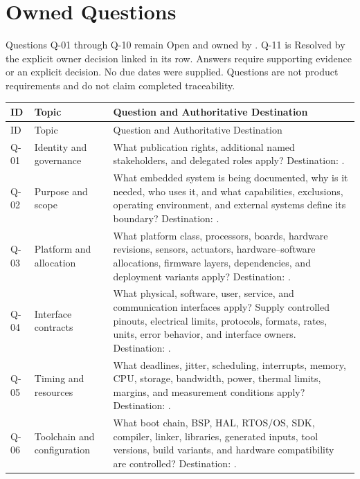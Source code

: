 \section{Owned Questions}
\label{Section:OwnedQuestions}
Questions Q-01 through Q-10 remain Open and owned by \DocumentOwner.
Q-11 is Resolved by the explicit owner decision linked in its row. Answers require
supporting evidence or an explicit decision. No due dates were supplied.
Questions are not product requirements and do not claim completed traceability.
\small
\begin{tabularx}{\linewidth}{L{1.0cm}L{3.0cm}Y}
\caption{Owned Initialization Questions\label{Table:OwnedQuestions}}\\
\toprule ID & Topic & Question and Authoritative Destination\\\midrule
\endfirsthead
\toprule ID & Topic & Question and Authoritative Destination\\\midrule
\endhead
\bottomrule\endlastfoot
{}\label{Question:Q-01}Q-01 & Identity and governance & What publication rights, additional named stakeholders, and delegated roles apply? Destination: .\\
\label{Question:Q-02}Q-02 & Purpose and scope & What embedded system is being documented, why is it needed, who uses it, and what capabilities, exclusions, operating environment, and external systems define its boundary? Destination: .\\
\label{Question:Q-03}Q-03 & Platform and allocation & What platform class, processors, boards, hardware revisions, sensors, actuators, hardware--software allocations, firmware layers, dependencies, and deployment variants apply? Destination: .\\
\label{Question:Q-04}Q-04 & Interface contracts & What physical, software, user, service, and communication interfaces apply? Supply controlled pinouts, electrical limits, protocols, formats, rates, units, error behavior, and interface owners. Destination: .\\
\label{Question:Q-05}Q-05 & Timing and resources & What deadlines, jitter, scheduling, interrupts, memory, CPU, storage, bandwidth, power, thermal limits, margins, and measurement conditions apply? Destination: .\\
\label{Question:Q-06}Q-06 & Toolchain and configuration & What boot chain, BSP, HAL, RTOS/OS, SDK, compiler, linker, libraries, generated inputs, tool versions, build variants, and hardware compatibility are controlled? Destination: .\\

\end{tabularx}
